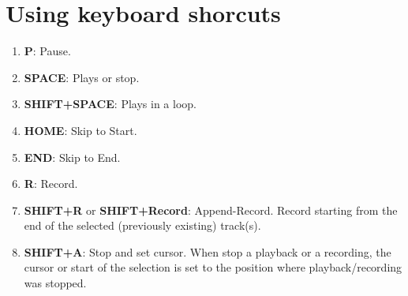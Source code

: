 \section{Using keyboard shorcuts}
\begin{enumerate}
\item \textbf{P}: Pause.
\item \textbf{SPACE}: Plays or stop.
\item \textbf{SHIFT+SPACE}: Plays in a loop.
\item \textbf{HOME}: Skip to Start.
\item \textbf{END}: Skip to End.
\item \textbf{R}: Record.
\item \textbf{SHIFT+R} or \textbf{SHIFT+Record}: Append-Record. Record
  starting from the end of the selected (previously existing)
  track(s).
\item \textbf{SHIFT+A}: Stop and set cursor. When stop a playback or a
  recording, the cursor or start of the selection is set to the
  position where playback/recording was stopped.
\end{enumerate}

